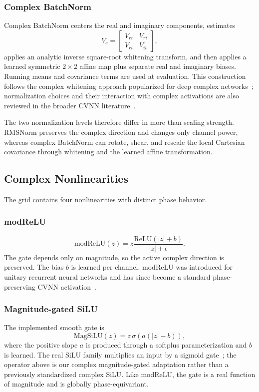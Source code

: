 \subsubsection{Complex BatchNorm}
Complex BatchNorm centers the real and imaginary components, estimates
\begin{equation}
V_c=\begin{bmatrix}V_{rr}&V_{ri}\\V_{ri}&V_{ii}\end{bmatrix},
\end{equation}
applies an analytic inverse square-root whitening transform, and then applies a learned symmetric $2\times2$ affine map plus separate real and imaginary biases. Running means and covariance terms are used at evaluation. This construction follows the complex whitening approach popularized for deep complex networks~\cite{Trabelsi2018DeepComplex}; normalization choices and their interaction with complex activations are also reviewed in the broader CVNN literature~\cite{Lee2022CVNNSurvey}.

The two normalization levels therefore differ in more than scaling strength. RMSNorm preserves the complex direction and changes only channel power, whereas complex BatchNorm can rotate, shear, and rescale the local Cartesian covariance through whitening and the learned affine transformation.

\subsection{Complex Nonlinearities}
The grid contains four nonlinearities with distinct phase behavior.

\subsubsection{modReLU}
\begin{equation}
\mathrm{modReLU}(z)=z\frac{\mathrm{ReLU}(|z|+b)}{|z|+\epsilon}.
\end{equation}
The gate depends only on magnitude, so the active complex direction is preserved. The bias $b$ is learned per channel. modReLU was introduced for unitary recurrent neural networks and has since become a standard phase-preserving CVNN activation~\cite{Arjovsky2016Unitary,Lee2022CVNNSurvey}.

\subsubsection{Magnitude-gated SiLU}
The implemented smooth gate is
\begin{equation}
\mathrm{MagSiLU}(z)=z\,\sigma\!\left(a(|z|-b)\right),
\end{equation}
where the positive slope $a$ is produced through a softplus parameterization and $b$ is learned. The real SiLU family multiplies an input by a sigmoid gate~\cite{Elfwing2018SiLU}; the operator above is our complex magnitude-gated adaptation rather than a previously standardized complex SiLU. Like modReLU, the gate is a real function of magnitude and is globally phase-equivariant.

